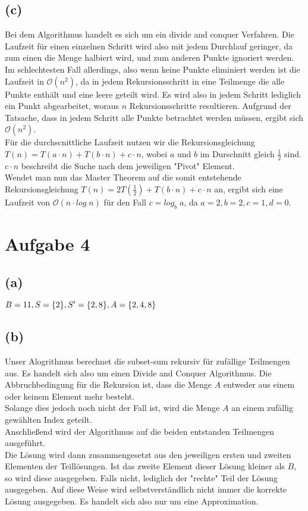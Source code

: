 \documentclass[a4paper]{scrartcl}
\begin{document}
\subsection*{(c)}
Bei dem Algorithmus handelt es sich um ein divide and conquer Verfahren. Die Laufzeit für einen einzelnen Schritt wird also mit jedem Durchlauf geringer, da zum einen die Menge halbiert wird, und zum anderen Punkte ignoriert werden.\\
Im schlechtesten Fall allerdings, also wenn keine Punkte eliminiert werden ist die Laufzeit in $\mathcal{O}(n^2)$, da in jedem Rekursionsschritt in eine Teilmenge die alle Punkte enthält und eine leere geteilt wird.
Es wird also in jedem Schritt lediglich ein Punkt abgearbeitet, woraus $n$ Rekursionsschritte resultieren. Aufgrund der Tatsache, dass in jedem Schritt alle Punkte betrachtet werden müssen, ergibt sich $\mathcal{O}(n^2)$.\\
Für die durchscnittliche Laufzeit nutzen wir die Rekursionsgleichung $T(n) = T(a \cdot n) + T(b \cdot n) + c \cdot n$, wobei $a$ und $b$ im Durschnitt gleich $\frac{1}{2}$ sind. $c \cdot n$ beschreibt die Suche nach dem jeweiligen "Pivot" Element. \\
Wendet man nun das Master Theorem auf die somit entstehende  Rekursionsgleichung $T(n) = 2T(\frac{1}{2}) + T(b \cdot n) + c \cdot n$ an, ergibt sich eine Laufzeit von $\mathcal{O}(n \cdot log\;n)$ für den Fall $c = log_b\;a$, da $a = 2, b=2, c = 1, d = 0$.





\section*{Aufgabe 4}
\subsection*{(a)}
$
B = 11,\\
S = \lbrace 2 \rbrace,\\
S' = \lbrace 2,8\rbrace,\\
A = \lbrace 2,4,8 \rbrace
$

\subsection*{(b)}
Unser Alogrithmus berechnet die subset-sum rekursiv für zufällige Teilmengen aus. Es handelt sich also um einen Divide and Conquer Algorithmus. Die Abbruchbedingung für die Rekursion ist, dass die Menge $A$ entweder aus einem oder keinem Element mehr besteht.\\
Solange dies jedoch noch nicht der Fall ist, wird die Menge $A$ an einem zufällig gewählten Index geteilt.\\
Anschließend wird der Algorithmus auf die beiden entstanden Teilmengen ausgeführt.\\
Die Lösung wird dann zusammengesetzt aus den jeweiligen ersten und zweiten Elementen der Teillösungen. Ist das zweite Element dieser Lösung kleiner als $B$, so wird diese ausgegeben. Falls nicht, lediglich der "rechte" Teil der Lösung ausgegeben. Auf diese Weise wird selbstverständlich nicht immer die korrekte Lösung ausgegeben. Es handelt sich also nur um eine Approximation.
\end{document}
